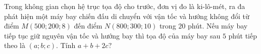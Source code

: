 \begin{bt}%
	Trong không gian chọn hệ trục tọa độ cho trước, đơn vị đo là ki-lô-mét, ra đa phát hiện một máy bay chiến đấu di chuyển với vận tốc và hướng không đổi từ điểm $M (500;200;8)$ đến điểm $N(800;300;10)$ trong $20$ phút. Nếu máy bay  tiếp tục giữ nguyên vận tốc và hướng bay thì tọa độ của máy bay sau $5$ phút tiếp theo là $(a;b;c)$. Tính $a+b+2c?$
\end{bt}

